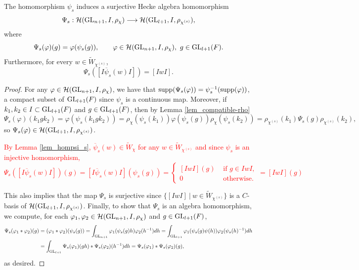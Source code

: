     \begin{proposition}\label{prop_algebrahom}
        The homomorphism $\psi_s$ induces a surjective Hecke algebra homomorphism 
        \begin{equation*}
            \Psi_s:\mathcal{H}(\mathrm{GL}_{n+1},I,\rho_\chi)\longrightarrow\mathcal{H}(\mathrm{GL}_{l+1},I,\rho_{\chi^{(s)}}),
        \end{equation*}
        where
        $$\Psi_s(\varphi)(g)=\varphi(\psi_s(g)),\quad\quad \varphi\in\mathcal{H}(\mathrm{GL}_{n+1},I,\rho_\chi),\ g\in\mathrm{GL}_{l+1}(F).$$
        Furthermore, for every $w\in\widetilde{W}_{\chi^{(s)}}$,
        $$\Psi_s([I\overline{\psi}_s(w)I])=[IwI].$$
    \end{proposition}
    \begin{proof}
        For any $\varphi\in\mathcal{H}(\mathrm{GL}_{n+1},I,\rho_\chi)$, we have that $\mathrm{supp}(\Psi_s(\varphi))=\psi_s^{-1}(\mathrm{supp}(\varphi))$, a compact subset of $\mathrm{GL}_{l+1}(F)$ since $\psi_s$ is a continuous map. Moreover, if $k_1,k_2\in I\subset\mathrm{GL}_{l+1}(F)$ and $g\in\mathrm{GL}_{l+1}(F)$, then by Lemma \ref{lem_compatible-rho}
        $$\Psi_s(\varphi)(k_1gk_2)=\varphi(\psi_s(k_1gk_2))=\rho_\chi(\psi_s(k_1))\varphi(\psi_s(g))\rho_\chi(\psi_s(k_2))=\rho_{\chi^{(s)}}(k_1)\Psi_s(g)\rho_{\chi^{(s)}}(k_2),$$
        so $\Psi_s(\varphi)\in\mathcal{H}(\mathrm{GL}_{l+1},I,\rho_{\chi^{(s)}})$. 

        \textcolor{red}{By Lemma \ref{lem_hompsi_s}, $\overline{\psi}_s(w)\in \widetilde{W}_{\chi}$ for any $w\in\widetilde{W}_{\chi^{(s)}}$ and since $\psi_s$ is an injective homomorphism,
        \begin{equation*}
            \Psi_s\left([I\overline{\psi}_s(w)I]\right)(g)=[I\overline{\psi}_s(w)I](\psi_s(g))=
            \begin{cases}
                [IwI](g)&\text{ if }g\in IwI,\\
                0 &\text{ otherwise}.
            \end{cases}
            =[IwI](g)
        \end{equation*}}
        
        This also implies that the map $\Psi_s$ is surjective since $\{[IwI]\ |\ w\in\widetilde{W}_{\chi^{(s)}}\}$ is a $C$-basis of $\mathcal{H}(\mathrm{GL}_{l+1},I,\rho_{\chi^{(s)}})$.
        Finally, to show that $\Psi_s$ is an algebra homomorphism, we compute, for each $\varphi_1,\varphi_2\in\mathcal{H}(\mathrm{GL}_{n+1},I,\rho_\chi)$ and $g\in\mathrm{GL}_{l+1}(F)$,
        \begin{align*}
            \Psi_s(\varphi_1*\varphi_2)(g)&=(\varphi_1*\varphi_2)(\psi_s(g))=\int_{\mathrm{GL}_{n+1}}\varphi_1(\psi_s(g)h)\varphi_2(h^{-1})dh
            =\int_{\mathrm{GL}_{l+1}}\varphi_1(\psi_s(g)\psi(h))\varphi_2(\psi_s(h)^{-1})dh\\
            &=\int_{\mathrm{GL}_{l+1}}\Psi_s(\varphi_1)(gh)*\Psi_s(\varphi_2)(h^{-1})dh=\Psi_s(\varphi_1)*\Psi_s(\varphi_2)(g),
        \end{align*}
        as desired.
    \end{proof}

